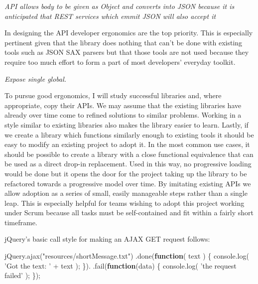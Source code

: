 \documentclass[]{article}
\newenvironment{Shaded}{}{}
\newcommand{\KeywordTok}[1]{\textcolor[rgb]{0.00,0.44,0.13}{\textbf{{#1}}}}
\newcommand{\StringTok}[1]{\textcolor[rgb]{0.25,0.44,0.63}{{#1}}}
\newcommand{\OtherTok}[1]{\textcolor[rgb]{0.00,0.44,0.13}{{#1}}}
\newcommand{\FunctionTok}[1]{\textcolor[rgb]{0.02,0.16,0.49}{{#1}}}
\newcommand{\NormalTok}[1]{{#1}}
\begin{document}
\emph{API allows body to be given as Object and converts into JSON
because it is anticipated that REST services which emmit JSON will also
accept it}

In designing the API developer ergonomics are the top priority. This is
especially pertinent given that the library does nothing that can't be
done with existing tools such as JSON SAX parsers but that those tools
are not used because they require too much effort to form a part of most
developers' everyday toolkit.

\emph{Expose single global.}

To pursue good ergonomics, I will study successful libraries and, where
appropriate, copy their APIs. We may assume that the existing libraries
have already over time come to refined solutions to similar problems.
Working in a style similar to existing libraries also makes the library
easier to learn. Lastly, if we create a library which functions
similarly enough to existing tools it should be easy to modify an
existing project to adopt it. In the most common use cases, it should be
possible to create a library with a close functional equivalence that
can be used as a direct drop-in replacement. Used in this way, no
progressive loading would be done but it opens the door for the project
taking up the library to be refactored towards a progressive model over
time. By imitating existing APIs we allow adoption as a series of small,
easily manageable steps rather than a single leap. This is especially
helpful for teams wishing to adopt this project working under Scrum
because all tasks must be self-contained and fit within a fairly short
timeframe.

jQuery's basic call style for making an AJAX GET request follows:

\begin{Shaded}
\begin{Highlighting}[]
\OtherTok{jQuery}\NormalTok{.}\FunctionTok{ajax}\NormalTok{(}\StringTok{"resources/shortMessage.txt"}\NormalTok{)}
   \NormalTok{.}\FunctionTok{done}\NormalTok{(}\KeywordTok{function}\NormalTok{( text ) \{}
      \OtherTok{console}\NormalTok{.}\FunctionTok{log}\NormalTok{( }\StringTok{'Got the text: '} \NormalTok{+ text ); }
   \NormalTok{\}).}
   \NormalTok{.}\FunctionTok{fail}\NormalTok{(}\KeywordTok{function}\NormalTok{(data) \{}
      \OtherTok{console}\NormalTok{.}\FunctionTok{log}\NormalTok{( }\StringTok{'the request failed'} \NormalTok{);      }
   \NormalTok{\});}
\end{Highlighting}
\end{Shaded}
\end{document}

